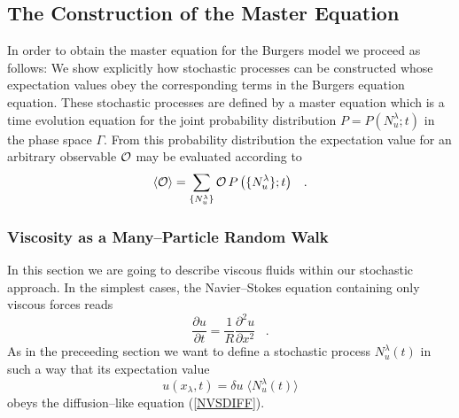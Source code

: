 \subsection{The Construction of the Master Equation}

In order to obtain the master equation for the Burgers model  we proceed
as follows: We show explicitly how stochastic processes can be
constructed whose expectation values obey the corresponding
terms in the Burgers equation equation. These stochastic processes
are defined by a master equation which is a time evolution equation
for the joint probability distribution $P=P(N_u^{\lambda};t)$ in the
phase space $\Gamma$. From this probability distribution the
expectation
value for an arbitrary observable ${\cal{O}}$ may be evaluated
according to
\begin{equation}
\langle {\cal{O}} \rangle = \sum_{\left\{ N_u^{\lambda} \right\}}
{\cal{O}} \, P \left( \{ N_u^{\lambda} \} ;t \right) \;\;\; .
\end{equation}

\subsubsection{Viscosity as a Many--Particle Random Walk}
In this section we are going to describe viscous fluids within
our stochastic
approach. In the simplest cases, the Navier--Stokes equation
containing only
viscous forces reads
\begin{equation}
\label{NVSDIFF}
\frac{\partial u}{\partial t} =
   \frac{1}{R} \frac{\partial^2 u}{\partial x^2} \;\;\; .
\end{equation}
As in the preceeding section we want to define a stochastic process
$N_u^{\lambda}(t)$
in such a way that its expectation value
\begin{equation}            \label{EXP2}
u(x_{\lambda},t) = \delta u \; \langle N_u^{\lambda}(t) \rangle
\end{equation}
obeys the diffusion--like equation (\ref{NVSDIFF}).

